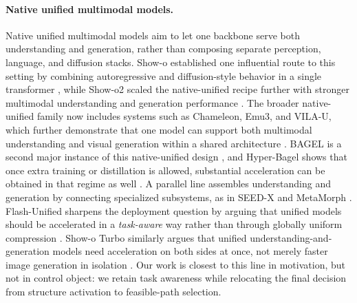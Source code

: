 \documentclass{article}
\begin{document}
\paragraph{Native unified multimodal models.} Native unified multimodal models aim to let one backbone serve both understanding and generation, rather than composing separate perception, language, and diffusion stacks. Show-o established one influential route to this setting by combining autoregressive and diffusion-style behavior in a single transformer \citep{showo}, while Show-o2 scaled the native-unified recipe further with stronger multimodal understanding and generation performance \citep{showo2}. The broader native-unified family now includes systems such as Chameleon, Emu3, and VILA-U, which further demonstrate that one model can support both multimodal understanding and visual generation within a shared architecture \citep{team2024chameleon,wang2024emu3,vila-u}. BAGEL is a second major instance of this native-unified design \citep{bagel}, and Hyper-Bagel shows that once extra training or distillation is allowed, substantial acceleration can be obtained in that regime as well \citep{hyperbagel}. A parallel line assembles understanding and generation by connecting specialized subsystems, as in SEED-X and MetaMorph \citep{seed-x,tong2024metamorph}. Flash-Unified sharpens the deployment question by arguing that unified models should be accelerated in a \emph{task-aware} way rather than through globally uniform compression \citep{flash}. Show-o Turbo similarly argues that unified understanding-and-generation models need acceleration on both sides at once, not merely faster image generation in isolation \citep{showoturbo}. Our work is closest to this line in motivation, but not in control object: we retain task awareness while relocating the final decision from structure activation to feasible-path selection.
\end{document}
